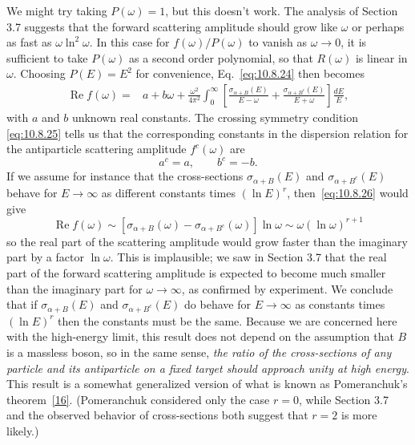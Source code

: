 We might try taking $P(\omega)=1$, but this doesn't work. The analysis of
Section 3.7 suggests that the forward scattering amplitude should grow like
$\omega$ or perhaps as fast as $\omega\ln^2\omega$. In this case for
$f(\omega)/P(\omega)$ to vanish as $\omega\to0$, it is sufficient to take
$P(\omega)$ as a second order polynomial, so that $R(\omega)$ is linear in
$\omega$. Choosing $P(E)=E^2$ for convenience, Eq.~\eqref{eq:10.8.24}
then becomes
\begin{align}
  \operatorname{Re}f(\omega)={}&a+b\omega
  +\frac{\omega^2}{4\pi^2}\int_0^\infty
  \left[\frac{\sigma_{\alpha+B}(E)}{E-\omega}
  +\frac{\sigma_{\alpha+B^c}(E)}{E+\omega}\right]\frac{dE}{E},
  \tag{10.8.26}\label{eq:10.8.26}
\end{align}
with $a$ and $b$ unknown real constants. The crossing symmetry condition
\eqref{eq:10.8.25} tells us that the corresponding constants in the dispersion
relation for the antiparticle scattering amplitude $f^c(\omega)$ are
\begin{equation}
  a^c=a,\qquad b^c=-b.
  \tag{10.8.27}\label{eq:10.8.27}
\end{equation}
If we assume for instance that the cross-sections $\sigma_{\alpha+B}(E)$ and
$\sigma_{\alpha+B^c}(E)$ behave for $E\to\infty$ as different constants
times $(\ln E)^r$, then~\eqref{eq:10.8.26} would give
\begin{equation}
  \operatorname{Re}f(\omega)\sim
  [\sigma_{\alpha+B}(\omega)-\sigma_{\alpha+B^c}(\omega)]\ln\omega
  \sim\omega(\ln\omega)^{r+1}
  \tag{10.8.28}\label{eq:10.8.28}
\end{equation}
so the real part of the scattering amplitude would grow faster than the
imaginary part by a factor $\ln\omega$. This is implausible; we saw in Section
3.7 that the real part of the forward scattering amplitude is expected to
become much smaller than the imaginary part for $\omega\to\infty$, as
confirmed by experiment. We conclude that if $\sigma_{\alpha+B}(E)$ and
$\sigma_{\alpha+B^c}(E)$ do behave for $E\to\infty$ as constants times
$(\ln E)^r$ then the constants must be the same. Because we are concerned
here with the high-energy limit, this result does not depend on the assumption
that $B$ is a massless boson, so in the same sense, \emph{the ratio of the
cross-sections of any particle and its antiparticle on a fixed target should
approach unity at high energy}. This result is a somewhat generalized version
of what is known as Pomeranchuk's theorem~\hyperref[ref:10.16]{[16]}.
(Pomeranchuk considered only the case $r=0$, while Section 3.7 and the
observed behavior of cross-sections both suggest that $r=2$ is more likely.)

